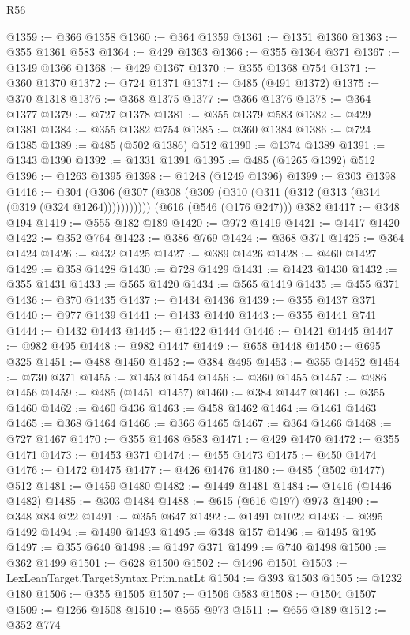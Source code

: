 \begin{lexlean}{R56}
\begin{coremodule}
@1359 := @366 @1358
@1360 := @364 @1359
@1361 := @1351 @1360
@1363 := @355 @1361 @583
@1364 := @429 @1363
@1366 := @355 @1364 @371
@1367 := @1349 @1366
@1368 := @429 @1367
@1370 := @355 @1368 @754
@1371 := @360 @1370
@1372 := @724 @1371
@1374 := @485 (@491 @1372)
@1375 := @370 @1318
@1376 := @368 @1375
@1377 := @366 @1376
@1378 := @364 @1377
@1379 := @727 @1378
@1381 := @355 @1379 @583
@1382 := @429 @1381
@1384 := @355 @1382 @754
@1385 := @360 @1384
@1386 := @724 @1385
@1389 := @485 (@502 @1386) @512
@1390 := @1374 @1389
@1391 := @1343 @1390
@1392 := @1331 @1391
@1395 := @485 (@1265 @1392) @512
@1396 := @1263 @1395
@1398 := @1248 (@1249 @1396)
@1399 := @303 @1398
@1416 := @304
    (@306 (@307 (@308 (@309 (@310 (@311 (@312 (@313 (@314 (@319 (@324 @1264)))))))))))
    (@616 (@546 (@176 @247)))
    @382
@1417 := @348 @194
@1419 := @555 @182 @189
@1420 := @972 @1419
@1421 := @1417 @1420
@1422 := @352 @764
@1423 := @386 @769
@1424 := @368 @371
@1425 := @364 @1424
@1426 := @432 @1425
@1427 := @389 @1426
@1428 := @460 @1427
@1429 := @358 @1428
@1430 := @728 @1429
@1431 := @1423 @1430
@1432 := @355 @1431
@1433 := @565 @1420
@1434 := @565 @1419
@1435 := @455 @371
@1436 := @370 @1435
@1437 := @1434 @1436
@1439 := @355 @1437 @371
@1440 := @977 @1439
@1441 := @1433 @1440
@1443 := @355 @1441 @741
@1444 := @1432 @1443
@1445 := @1422 @1444
@1446 := @1421 @1445
@1447 := @982 @495
@1448 := @982 @1447
@1449 := @658 @1448
@1450 := @695 @325
@1451 := @488 @1450
@1452 := @384 @495
@1453 := @355 @1452
@1454 := @730 @371
@1455 := @1453 @1454
@1456 := @360 @1455
@1457 := @986 @1456
@1459 := @485 (@1451 @1457)
@1460 := @384 @1447
@1461 := @355 @1460
@1462 := @460 @436
@1463 := @458 @1462
@1464 := @1461 @1463
@1465 := @368 @1464
@1466 := @366 @1465
@1467 := @364 @1466
@1468 := @727 @1467
@1470 := @355 @1468 @583
@1471 := @429 @1470
@1472 := @355 @1471
@1473 := @1453 @371
@1474 := @455 @1473
@1475 := @450 @1474
@1476 := @1472 @1475
@1477 := @426 @1476
@1480 := @485 (@502 @1477) @512
@1481 := @1459 @1480
@1482 := @1449 @1481
@1484 := @1416 (@1446 @1482)
@1485 := @303 @1484
@1488 := @615 (@616 @197) @973
@1490 := @348 @84 @22
@1491 := @355 @647
@1492 := @1491 @1022
@1493 := @395 @1492
@1494 := @1490 @1493
@1495 := @348 @157
@1496 := @1495 @195
@1497 := @355 @640
@1498 := @1497 @371
@1499 := @740 @1498
@1500 := @362 @1499
@1501 := @628 @1500
@1502 := @1496 @1501
@1503 := LexLeanTarget.TargetSyntax.Prim.natLt
@1504 := @393 @1503
@1505 := @1232 @180
@1506 := @355 @1505
@1507 := @1506 @583
@1508 := @1504 @1507
@1509 := @1266 @1508
@1510 := @565 @973
@1511 := @656 @189
@1512 := @352 @774

\end{coremodule}
\end{lexlean}
